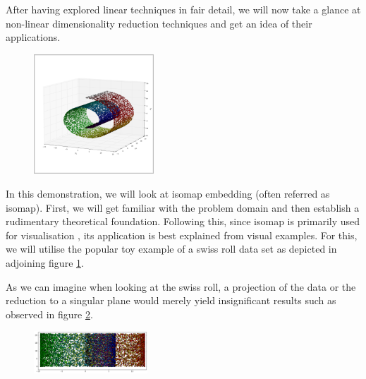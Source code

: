 After having explored linear techniques in fair detail, we will now take a glance at non-linear dimensionality reduction techniques and get an idea of their applications.

\begin{figure}
	\centering
	\includegraphics[width=0.4\textwidth]{external_content/graphs/swiss_roll.png}
	\captionsetup{justification=centering}
	\label{fig:swissrollfull}
\end{figure}

In this demonstration, we will look at isomap embedding (often referred as isomap).
First, we will get familiar with the problem domain and then establish a rudimentary theoretical foundation.
Following this, since isomap is primarily used for visualisation \cite{HandsOnMLCh8}, its application is best explained from visual examples.
For this, we will utilise the popular toy example of a swiss roll data set as depicted in adjoining figure \ref{fig:swissrollfull}.

As we can imagine when looking at the swiss roll, a projection of the data or the reduction to a \gls{singular} plane would merely yield insignificant results such as observed in figure \ref{fig:swissrollprojection}.

\begin{figure}
	\centering
	\includegraphics[width=0.38\textwidth]{external_content/graphs/swiss_roll-projection.png}
	\captionsetup{justification=centering}
	\label{fig:swissrollprojection}
\end{figure}

